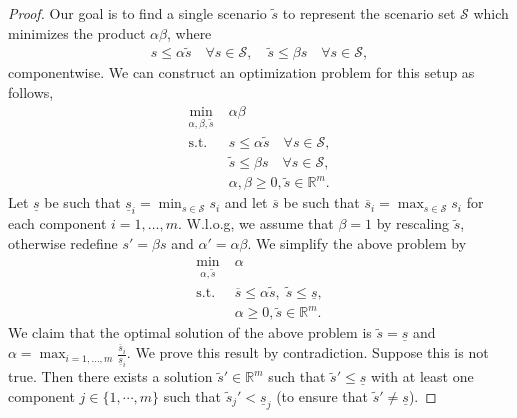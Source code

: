 \documentclass{article}
\newcommand{\mS}{\mathcal{S}}
\newcommand{\R}{\mathbb{R}}
\begin{document}
\begin{proof}%
Our goal is to find a single scenario \(\tilde{s}\) to represent the scenario set $\mS$ which minimizes the product \(\alpha \beta\), where 
\[
\begin{aligned}
s \leq \alpha \tilde{s} \quad\forall s \in \mathcal{S}, \quad
\tilde{s} \leq \beta s \quad \forall s \in \mathcal{S},
\end{aligned}
\]
componentwise.
We can construct an optimization problem for this setup as follows,
\begin{align}
	\min_{\alpha, \beta, \tilde{s}} &\; \alpha \beta \\
	\text{s.t.} &\; s \leq \alpha \tilde{s} \quad \forall s \in \mathcal{S},\\
	&\; \tilde{s} \leq \beta s \quad \forall s \in \mathcal{S},\\
	&\;  \alpha,\beta \geq 0, \tilde{s} \in \R^m.
\end{align}
Let \(\underline{s}\) be such that \(\underline{s}_i = \min_{s \in \mathcal{S}}s_i\) and let \(\overline{s}\) be such that \(\overline{s}_i = \max_{s \in \mathcal{S}} s_i\) for each component $i=1,\ldots,m$.
W.l.o.g, we assume that \(\beta = 1\) by rescaling $\tilde{s}$, otherwise redefine $s'=\beta s$ and $\alpha'=\alpha \beta$.
We simplify the above problem by 
\begin{equation}
	\label{prob:approx_basic}
\begin{aligned}
\min_{\alpha, \tilde{s}} &\; \alpha\\
\text{s.t.} &\; \overline{s} \leq \alpha \tilde{s},\; \tilde{s} \leq \underline{s},\\
&\; \alpha \geq 0, \tilde{s} \in \R^m.
\end{aligned}
\end{equation}
We claim that the optimal solution of the above problem is \(\tilde{s} = \underline{s}\) and \(\alpha = \max_{i=1,\dots,m}\frac{\overline{s}_i}{\underline{s}_i}\). 
We prove this result by contradiction. 
Suppose this is not true. Then there exists a solution \(\tilde{s}'\in\R^m \) such that \(\tilde{s}' \leq \underline{s}\) with at least one component \(j\in\{1,\cdots,m\}\) such that \(\tilde{s}_j' < \underline{s}_j\) (to ensure that \(\tilde{s}' \neq \underline{s}\)).

\end{proof}
\end{document}
